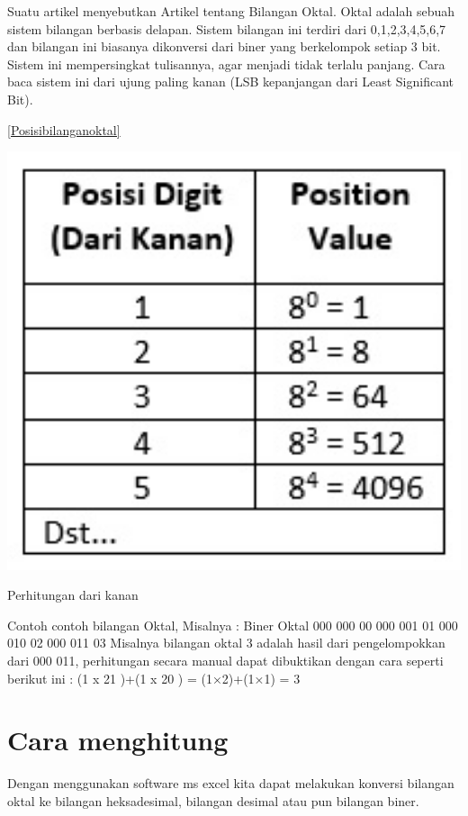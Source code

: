 ﻿%




Suatu artikel menyebutkan \cite{dale2001spacer}
Artikel tentang Bilangan Oktal.
Oktal adalah sebuah sistem bilangan berbasis delapan. Sistem bilangan ini terdiri dari 0,1,2,3,4,5,6,7 dan bilangan ini biasanya dikonversi dari biner yang berkelompok setiap 3 bit. Sistem ini mempersingkat tulisannya, agar menjadi tidak terlalu panjang. Cara baca sistem ini dari ujung paling kanan (LSB kepanjangan dari Least Significant Bit).

	\ref{Posisibilanganoktal}
	\begin{figures}[ht]
	\centerline{\includegraphics[width=1\textwidth]{figures/Posisibilanganoktal.JPG}}
	\caption{Perhitungan dari kanan}
	\label{Posisibilanganoktal}
	\end{figures}

Contoh contoh bilangan Oktal,
Misalnya : 
Biner Oktal
000 000 00
000 001 01
000 010 02
000 011 03
Misalnya bilangan oktal 3 adalah hasil dari pengelompokkan dari 000 011, perhitungan secara manual dapat dibuktikan dengan cara seperti berikut ini :
(1 x 21 )+(1 x 20 ) = (1×2)+(1×1) = 3

\section{Cara menghitung}
Dengan menggunakan software ms excel kita dapat melakukan konversi bilangan oktal ke bilangan heksadesimal, bilangan desimal atau pun bilangan biner.
